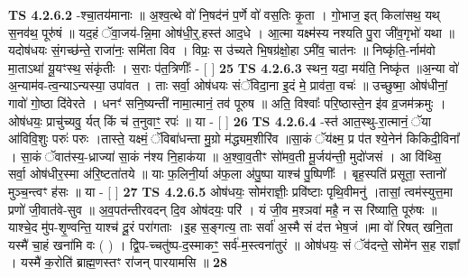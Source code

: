 \documentclass[17pt]{extarticle}
\begin{document}
                  \newline
                                \textbf{ TS 4.2.6.2} \newline
                  -श्चा॒तय॑मानाः ॥ अ॒श्व॒त्थे वो॑ नि॒षद॑नं प॒र्णे वो॑ वस॒तिः कृ॒ता । गो॒भाज॒ इत् किला॑सथ॒ यथ् स॒नव॑थ॒ पूरु॑षं ॥ यद॒हं ॅवा॒जय॑-न्नि॒मा ओष॑धी॒र्॒.हस्त॑ आद॒धे । आ॒त्मा यक्ष्म॑स्य नश्यति पु॒रा जी॑व॒गृभो॑ यथा ॥ यदोष॑धयः सं॒गच्छ॑न्ते॒ राजा॑नः॒ समि॑ता विव । विप्रः॒ स उ॑च्यते भि॒षग्र॑क्षो॒हा ऽमी॑व॒ चात॑नः ॥ निष्कृ॑ति॒-र्नाम॑वो मा॒ताऽथा॑ यू॒यꣳस्थ॒ संकृ॑तीः । स॒राः प॑त॒त्रिणीः᳚ - [  ] \textbf{  25} \newline
                  \newline
                                \textbf{ TS 4.2.6.3} \newline
                  स्थन॒ यदा॒ मय॑ति॒ निष्कृ॑त ॥अ॒न्या वो॑ अ॒न्याम॑व-त्व॒न्याऽन्यस्या॒ उपा॑वत । ताः सर्वा॒ ओष॑धयः संॅविदा॒ना इ॒दं मे॒ प्राव॑ता॒ वचः॑ ॥ उच्छुष्मा॒ ओष॑धीनां॒ गावो॑ गो॒ष्ठा दि॑वेरते । धनꣳ॑ सनि॒ष्यन्ती॑ नामा॒त्मानं॒ तव॑ पूरुष ॥ अति॒ विश्वाः᳚ परि॒ष्ठास्ते॒न इ॑व व्र॒जम॑क्रमुः । ओष॑धयः॒ प्राचु॑च्यवु॒ र्यत् किं च॑ त॒नुवाꣳ॒॒ रपः॑ ॥ या - [  ] \textbf{  26} \newline
                  \newline
                                \textbf{ TS 4.2.6.4} \newline
                  -स्त॑ आत॒स्थु-रा॒त्मानं॒ ॅया आ॑विवि॒शुः परुः॑ परुः ।तास्ते॒ यक्ष्मं॒ ॅविबा॑धन्ता मु॒ग्रो म॑द्ध्यम॒शीरि॑व ॥सा॒कं ॅय॑क्ष्म॒ प्र प॑त श्ये॒नेन॑ किकिदी॒विना᳚ । सा॒कं ॅवात॑स्य॒-ध्राज्या॑ सा॒कं न॑श्य नि॒हाक॑या ॥ अ॒श्वा॒व॒तीꣳ सो॑मव॒ती मू॒र्जय॑न्ती॒ मुदो॑जसं । आ वि॑थ्सि॒ सर्वा॒ ओष॑धीर॒स्मा अ॑रि॒ष्टता॑तये ॥ याः फ॒लिनी॒र्या अ॑फ॒ला अ॑पु॒ष्पा याश्च॑ पु॒ष्पिणीः᳚ । बृह॒स्पति॑ प्रसूता॒ स्तानो॑ मुञ्च॒न्त्वꣳ ह॑सः ॥ या - [  ] \textbf{  27} \newline
                  \newline
                                \textbf{ TS 4.2.6.5} \newline
                  ओष॑धयः॒ सोम॑राज्ञीः॒ प्रवि॑ष्टाः पृथि॒वीमनु॑ ।तासां॒ त्वम॑स्युत्त॒मा प्रणो॑ जी॒वात॑वे-सुव ॥ अ॒व॒पत॑न्तीरवदन् दि॒व ओष॑दयः॒ परि॑ । यं जी॒व म॒श्ञवा॑ महै॒ न स रि॑ष्याति॒ पूरु॑षः ॥ याश्चे॒द मु॑प-शृ॒ण्वन्ति॒ याश्च॑ दू॒रं परा॑गताः ।इ॒ह स॒ङ्गत्य॒ ताः सर्वा॑ अ॒स्मै सं द॑त्त भेष॒जं ॥मा वो॑ रिषत् खनि॒ता यस्मै॑ चा॒हं खना॑मि वः ( ) । द्वि॒प-च्चतु॑ष्प-द॒स्माकꣳ॒॒ सर्व॑-म॒स्त्वना॑तुरं ॥ ओष॑धयः॒ सं ॅव॑दन्ते॒ सोमे॑न स॒ह राज्ञा᳚ । यस्मै॑ क॒रोति॑ ब्राह्म॒णस्तꣳ रा॑जन् पारयामसि ॥ \textbf{  28} \newline
                  \newline
\end{document}
